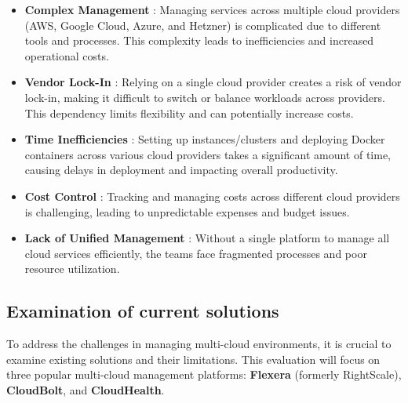 \begin{itemize}
  \item \textbf{Complex Management }:
  Managing services across multiple cloud providers (AWS, Google Cloud, Azure, and Hetzner) is complicated due to different tools and processes. This complexity leads to inefficiencies and increased operational costs.

  \item \textbf{Vendor Lock-In }:
  Relying on a single cloud provider creates a risk of vendor lock-in, making it difficult to switch or balance workloads across providers. This dependency limits flexibility and can potentially increase costs.

  \item \textbf{Time Inefficiencies }:
  Setting up instances/clusters and deploying Docker containers across various cloud providers takes a significant amount of time, causing delays in deployment and impacting overall productivity.

  \item \textbf{Cost Control }:
  Tracking and managing costs across different cloud providers is challenging, leading to unpredictable expenses and budget issues.

  \item \textbf{Lack of Unified Management }:
  Without a single platform to manage all cloud services efficiently, the teams face fragmented processes and poor resource utilization.
\end{itemize}


\subsection{Examination of current solutions}
To address the challenges in managing multi-cloud environments, it is crucial to examine existing solutions and their limitations. This evaluation will focus on three popular multi-cloud management platforms: \textbf{ Flexera} (formerly RightScale), \textbf{CloudBolt}, and \textbf{CloudHealth}.
